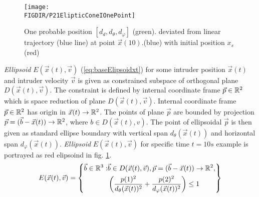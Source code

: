 \begin{figure}[H]
    \centering
    \texttt{[image: \\FIGDIR/P21ElipticConeIOnePoint]}
    \caption{One probable position $[d_d,d_\theta,d_\varphi]$ (green). deviated from linear trajectory (blue line) at point $\vec{x}(10)$.(blue) with initial position $x_s$ (red)}
    \label{fig:P21ElipticConeIOnePoint}
\end{figure}
\noindent \emph{Ellipsoid} $E(\vec{x}(t),\vec{v})$ (\ref{eq:baseElipsoidxt}) for some intruder position $\vec{x}(t)$ and intruder velocity $\vec{v}$ is given as constrained subspace of orthogonal plane $D(\vec{x}(t),\vec{v})$. The constraint is defined by internal coordinate frame $\vec{p}\in \mathbb{R}^2$ which is space reduction of plane $D(\vec{x}(t),\vec{v})$. Internal coordinate frame $\vec{p}\in\mathbb{R}^2$ has origin in $\vec{x}(t)\to\mathbb{R}^2$. The points of plane $\vec{p}$ are bounded by projection $\vec{p}=(\vec{b}-\vec{x}(t))\to\mathbb{R}^2$, where $b\in D(\vec{x}(t),v)$. The point of ellipsoidal $\vec{p}$ is then given as standard ellipse boundary with vertical span $d_\theta(\vec{x}(t))$ and horizontal span $d_\varphi(\vec{x}(t))$. \emph{Ellipsoid} $E(\vec{x}(t),\vec{v})$ for specific time $t=10s$ example is portrayed  as red elipsoind in fig. \ref{fig:P21ElipticConeIOnePoint}.
\begin{equation}\label{eq:baseElipsoidxt}
    E(\vec{x}(t),\vec{v})=\left\{ \begin{aligned}\vec{b}\in\mathbb{R}^3:&\vec{b}\in D(\vec{x}(t),\vec{v}),\vec{p}=(\vec{b}-\vec{x}(t))\to\mathbb{R}^2,\\&\left(\frac{p(1)^2} {d_\theta(\vec{x}(t))^2}+ \frac{p(2)^2}{d_\varphi(\vec{x}(t))^2}\right)\le 1\end{aligned}\right\}
\end{equation}

